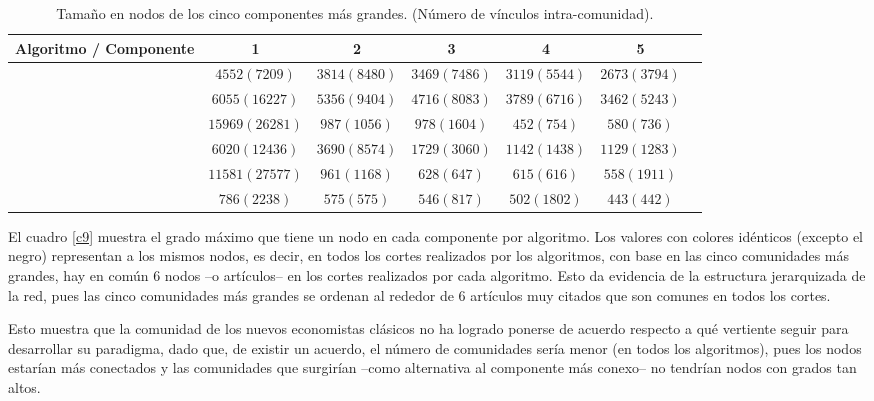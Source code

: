 \documentclass[12pt,letter]{article}
\begin{document}
\vspace{0.5cm}
\begin{table}[h!]
\centering
\resizebox{16cm}{!} {
\begin{tabular}{lcccccc}
\textbf{Algoritmo / Componente} & 1 & 2 & 3 & 4 & 5\\ \hline 
   \cite{Blondel} &$4552 (7209)$& $3814 (8480)$ & $3469 (7486)$ & $3119 (5544)$ & $2673 (3794)$ \\
   \cite{Clauset} &$6055 (16227)$&$5356 (9404)$&$4716 (8083)$&$3789 (6716)$&$3462 (5243)$\\
   \cite{Girvan1, Girvan2}  &$15969 (26281)$&$987(1056)$&$978 (1604)$&$452(754)$&$580 (736)$\\
    \cite{Pons}    &$6020 (12436)$&$3690 (8574)$ &$1729 (3060)$&$1142 (1438)$&$1129 (1283)$\\
    \cite{Raghavan}  &$11581 (27577)$&$961 (1168)$&$628 (647)$&$615 (616)$&$558 (1911)$\\
    \cite{Rosvall1} &$786 (2238)$&$575 (575)$&$546 (817)$&$502 (1802)$&$443 (442)$\\ \hline
\end{tabular}
}
\caption{\small{Tamaño en nodos de los cinco componentes más grandes. (Número de vínculos intra-comunidad)}.}
\label{c8}
\end{table}

\vspace{0.8cm}

El cuadro \ref{c9} muestra el grado máximo que tiene un nodo en cada componente por algoritmo. Los valores con colores idénticos (excepto el negro) representan a los mismos nodos, es decir, en todos los cortes realizados por los algoritmos, con base en las cinco comunidades más grandes, hay en común 6 nodos --o artículos-- en los cortes realizados por cada algoritmo. Esto da evidencia de la estructura jerarquizada de la red, pues las cinco comunidades más grandes se ordenan al rededor de 6 artículos muy citados que son comunes en todos los cortes. 

\vspace{0.5cm}

Esto muestra que la comunidad de los nuevos economistas clásicos no ha logrado ponerse de acuerdo respecto a qué vertiente seguir para desarrollar su paradigma, dado que, de existir un acuerdo, el número de comunidades sería menor (en todos los algoritmos), pues los nodos estarían más conectados y las comunidades que surgirían --como alternativa al componente más conexo-- no tendrían nodos con grados tan altos. 
\end{document}
